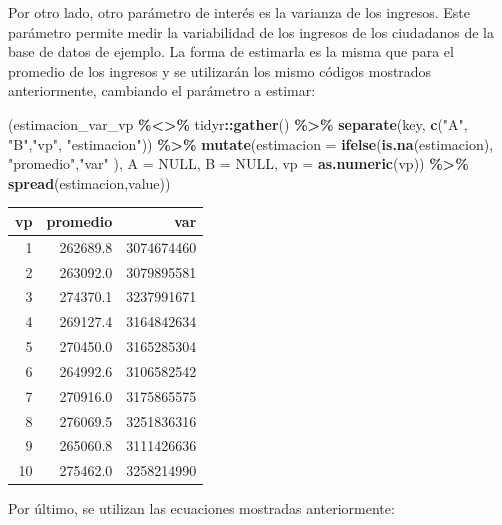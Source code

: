 \documentclass[
  spanish,
  12pt,
]{book}
\newenvironment{Shaded}{\begin{snugshade}}{\end{snugshade}}
\newcommand{\AttributeTok}[1]{\textcolor[rgb]{0.13,0.29,0.53}{#1}}
\newcommand{\ConstantTok}[1]{\textcolor[rgb]{0.56,0.35,0.01}{#1}}
\newcommand{\FunctionTok}[1]{\textcolor[rgb]{0.13,0.29,0.53}{\textbf{#1}}}
\newcommand{\NormalTok}[1]{#1}
\newcommand{\SpecialCharTok}[1]{\textcolor[rgb]{0.81,0.36,0.00}{\textbf{#1}}}
\newcommand{\StringTok}[1]{\textcolor[rgb]{0.31,0.60,0.02}{#1}}
\begin{document}
Por otro lado, otro parámetro de interés es la varianza de los ingresos. Este parámetro permite medir la variabilidad de los ingresos de los ciudadanos de la base de datos de ejemplo. La forma de estimarla es la misma que para el promedio de los ingresos y se utilizarán los mismo códigos mostrados anteriormente, cambiando el parámetro a estimar:

\begin{Shaded}
\begin{Highlighting}[]
\NormalTok{(estimacion\_var\_vp }\SpecialCharTok{\%\textless{}\textgreater{}\%}\NormalTok{ tidyr}\SpecialCharTok{::}\FunctionTok{gather}\NormalTok{() }\SpecialCharTok{\%\textgreater{}\%}
   \FunctionTok{separate}\NormalTok{(key, }\FunctionTok{c}\NormalTok{(}\StringTok{"A"}\NormalTok{, }\StringTok{"B"}\NormalTok{,}\StringTok{"vp"}\NormalTok{, }\StringTok{"estimacion"}\NormalTok{)) }\SpecialCharTok{\%\textgreater{}\%} 
\FunctionTok{mutate}\NormalTok{(}\AttributeTok{estimacion =} \FunctionTok{ifelse}\NormalTok{(}\FunctionTok{is.na}\NormalTok{(estimacion), }\StringTok{"promedio"}\NormalTok{,}\StringTok{"var"}\NormalTok{ ),}
       \AttributeTok{A =} \ConstantTok{NULL}\NormalTok{, }\AttributeTok{B =} \ConstantTok{NULL}\NormalTok{, }\AttributeTok{vp =} \FunctionTok{as.numeric}\NormalTok{(vp)) }\SpecialCharTok{\%\textgreater{}\%} 
  \FunctionTok{spread}\NormalTok{(estimacion,value))}
\end{Highlighting}
\end{Shaded}

\begin{tabular}{r|r|r}
\hline
vp & promedio & var\\
\hline
1 & 262689.8 & 3074674460\\
\hline
2 & 263092.0 & 3079895581\\
\hline
3 & 274370.1 & 3237991671\\
\hline
4 & 269127.4 & 3164842634\\
\hline
5 & 270450.0 & 3165285304\\
\hline
6 & 264992.6 & 3106582542\\
\hline
7 & 270916.0 & 3175865575\\
\hline
8 & 276069.5 & 3251836316\\
\hline
9 & 265060.8 & 3111426636\\
\hline
10 & 275462.0 & 3258214990\\
\hline
\end{tabular}

Por último, se utilizan las ecuaciones mostradas anteriormente:
\end{document}

